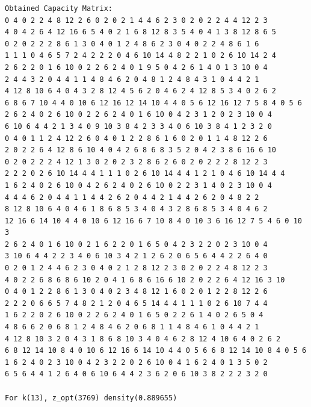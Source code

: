 \documentclass[11pt]{article}
\begin{document}
\begin{lstlisting}
Obtained Capacity Matrix:
0 4 0 2 2 4 8 12 2 6 0 2 0 2 1 4 4 6 2 3 0 2 0 2 2 4 4 12 2 3
4 0 4 2 6 4 12 16 6 5 4 0 2 1 6 8 12 8 3 5 4 0 4 1 3 8 12 8 6 5
0 2 0 2 2 2 8 6 1 3 0 4 0 1 2 4 8 6 2 3 0 4 0 2 2 4 8 6 1 6
1 1 1 0 4 6 5 7 2 4 2 2 2 0 4 6 10 14 4 8 2 2 1 0 2 6 10 14 2 4
2 6 2 2 0 1 6 10 0 2 2 6 2 4 0 1 9 5 0 4 2 6 1 4 0 1 3 10 0 4
2 4 4 3 2 0 4 4 1 1 4 8 4 6 2 0 4 8 1 2 4 8 4 3 1 0 4 4 2 1
4 12 8 10 6 4 0 4 3 2 8 12 4 5 6 2 0 4 6 2 4 12 8 5 3 4 0 2 6 2
6 8 6 7 10 4 4 0 10 6 12 16 12 14 10 4 4 0 5 6 12 16 12 7 5 8 4 0 5 6
2 6 2 4 0 2 6 10 0 2 2 6 2 4 0 1 6 10 0 4 2 3 1 2 0 2 3 10 0 4
6 10 6 4 4 2 1 3 4 0 9 10 3 8 4 2 3 3 4 0 6 10 3 8 4 1 2 3 2 0
0 4 0 1 1 2 4 12 2 6 0 4 0 1 2 2 8 6 1 6 0 2 0 1 1 4 8 12 2 6
2 0 2 2 6 4 12 8 6 10 4 0 4 2 6 8 6 8 3 5 2 0 4 2 3 8 6 16 6 10
0 2 0 2 2 2 4 12 1 3 0 2 0 2 3 2 8 6 2 6 0 2 0 2 2 2 8 12 2 3
2 2 2 0 2 6 10 14 4 4 1 1 1 0 2 6 10 14 4 4 1 2 1 0 4 6 10 14 4 4
1 6 2 4 0 2 6 10 0 4 2 6 2 4 0 2 6 10 0 2 2 3 1 4 0 2 3 10 0 4
4 4 4 6 2 0 4 4 1 1 4 4 2 6 2 0 4 4 2 1 4 4 2 6 2 0 4 8 2 2
8 12 8 10 6 4 0 4 6 1 8 6 8 5 3 4 0 4 3 2 8 6 8 5 3 4 0 4 6 2
12 16 6 14 10 4 4 0 10 6 12 16 6 7 10 8 4 0 10 3 6 16 12 7 5 4 6 0 10 3
2 6 2 4 0 1 6 10 0 2 1 6 2 2 0 1 6 5 0 4 2 3 2 2 0 2 3 10 0 4
3 10 6 4 4 2 2 3 4 0 6 10 3 4 2 1 2 6 2 0 6 5 6 4 4 2 2 6 4 0
0 2 0 1 2 4 4 6 2 3 0 4 0 2 1 2 8 12 2 3 0 2 0 2 2 4 8 12 2 3
4 0 2 2 6 8 6 8 6 10 2 0 4 1 6 8 6 16 6 10 2 0 2 2 6 4 12 16 3 10
0 4 0 1 2 2 8 6 1 3 0 4 0 2 3 4 8 12 1 6 0 2 0 1 2 2 8 12 2 6
2 2 2 0 6 6 5 7 4 8 2 1 2 0 4 6 5 14 4 4 1 1 1 0 2 6 10 7 4 4
1 6 2 2 0 2 6 10 0 2 2 6 2 4 0 1 6 5 0 2 2 6 1 4 0 2 6 5 0 4
4 8 6 6 2 0 6 8 1 2 4 8 4 6 2 0 6 8 1 1 4 8 4 6 1 0 4 4 2 1
4 12 8 10 3 2 0 4 3 1 8 6 8 10 3 4 0 4 6 2 8 12 4 10 6 4 0 2 6 2
6 8 12 14 10 8 4 0 10 6 12 16 6 14 10 4 4 0 5 6 6 8 12 14 10 8 4 0 5 6
1 6 2 4 0 2 3 10 0 4 2 3 2 2 0 2 6 10 0 4 1 6 2 4 0 1 3 5 0 2
6 5 6 4 4 1 2 6 4 0 6 10 6 4 4 2 3 6 2 0 6 10 3 8 2 2 2 3 2 0

For k(13), z_opt(3769) density(0.889655)


\end{lstlisting}
\end{document}
